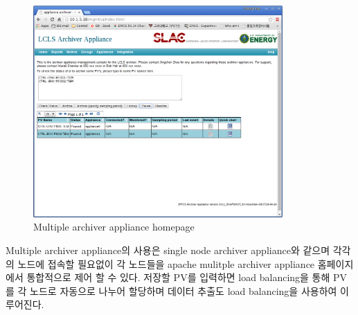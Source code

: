 \documentclass[11pt
  , a4paper
  , article
  , oneside
]{memoir}
\begin{document}
	\begin{figure}[h!]
		\centering
		\includegraphics[width=0.85\textwidth, height=0.6\textwidth]{./images/789456.png}
		\caption{Multiple archiver appliance homepage}
	\end{figure}


Multiple archiver appliance의 사용은 single node archiver appliance와 같으며 각각의 노드에 접속할 필요없이 각 노드들을 apache mulitple archiver appliance 홈페이지에서 통합적으로 제어 할 수 있다. 저장할 PV를 입력하면 load balancing을 통해 PV를 각 노드로 자동으로 나누어 할당하며 데이터 추출도 load balancing을 사용하여 이루어진다.
\clearpage
\end{document}
